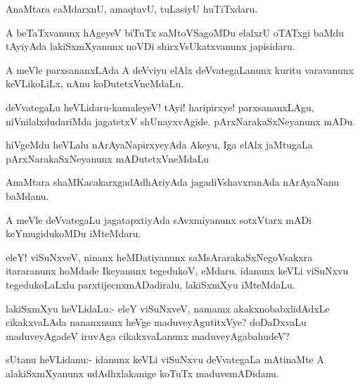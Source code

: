 \begin{mng}
AnaMtara caMdarxnU, amaqtavU, tuLasiyU huTiTxdaru.
\end{mng}

\begin{mng}
A beTaTxvanunx hAgeyeV biTuTx saMtoVSagoMDu elalxrU oTATxgi baMdu tAyiyAda lakiSxmXyanunx noVDi shirxVsUkatxvanunx japisidaru.
\end{mng}

\begin{mng}
A meVle parxsananxLAda A deVviyu elAlx deVvategaLanunx kuritu varavanunx keVLikoLiLx, nAnu koDutetxVneMdaLu.
\end{mng}

\begin{mng}
deVvategaLu heVLidaru-kamaleyeV! tAyi! haripirxye! parxsananxLAgu, niVnilalxdudariMda jagatetxV shUnayxvAgide. pArxNarakaSxNeyanunx mADu.
\end{mng}

\begin{mng}
hiVgeMdu heVLalu nArAyaNapirxyeyAda Akeyu, Iga elAlx jaMtugaLa pArxNarakaSxNeyanunx mADutetxVneMdaLu
\end{mng}

\begin{mng}
AnaMtara shaMKacakarxgadAdhAriyAda jagadiVshavxranAda nArAyaNanu baMdanu.
\end{mng}

\begin{mng}
A meVle deVvategaLu jagatapxtiyAda sAvxmiyanunx sotxVtarx mADi keYmugidukoMDu iMteMdaru.
\end{mng}

\begin{mng}
eleY! viSuNxveV, ninanx heMDatiyanunx saMsArarakaSxNegoVsakxra itararanunx hoMdade Ikeyanunx tegedukoV, eMdaru. idanunx keVLi viSuNxvu tegedukoLaLxlu parxtijecnxmADadiralu, lakiSxmXyu iMteMdaLu.
\end{mng}

\begin{mng}
lakiSxmXyu heVLidaLu:- eleY viSuNxveV, namamx akakxnobabxlidAdxLe cikakxvaLAda nananxnunx heVge maduveyAgutitxVye? doDaDxvaLu maduveyAgadeV iruvAga cikakxvaLanunx maduveyAgabahudeV?
\end{mng}

\begin{mng}
sUtanu heVLidanu:- idanunx keVLi viSuNxvu deVvategaLa mAtinaMte A alakiSxmXyanunx udAdhxlakanige koTuTx maduvemADidanu.
\end{mng}

